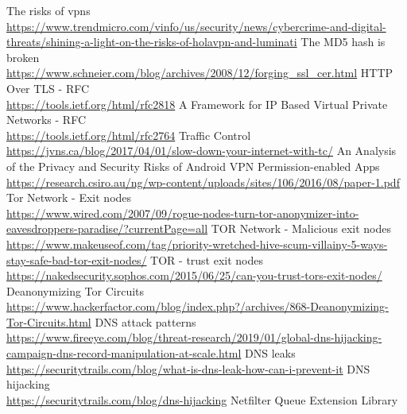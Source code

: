 \documentclass[12pt]{article}
\begin{document}
	
	\begin{thebibliography}{1}
			The risks of vpns\\
			\url{https://www.trendmicro.com/vinfo/us/security/news/cybercrime-and-digital-threats/shining-a-light-on-the-risks-of-holavpn-and-luminati}
			The MD5 hash is broken\\
			\url{https://www.schneier.com/blog/archives/2008/12/forging_ssl_cer.html}
			HTTP Over TLS - RFC\\
			\url{https://tools.ietf.org/html/rfc2818}
			A Framework for IP Based Virtual Private Networks - RFC\\
			\url{https://tools.ietf.org/html/rfc2764}
			Traffic Control\\
			\url{https://jvns.ca/blog/2017/04/01/slow-down-your-internet-with-tc/}
			An Analysis of the Privacy and Security Risks of
Android VPN Permission-enabled Apps\\
			\url{https://research.csiro.au/ng/wp-content/uploads/sites/106/2016/08/paper-1.pdf}
			Tor Network - Exit nodes\\
			\url{https://www.wired.com/2007/09/rogue-nodes-turn-tor-anonymizer-into-eavesdroppers-paradise/?currentPage=all}
			TOR Network - Malicious exit nodes\\
			\url{https://www.makeuseof.com/tag/priority-wretched-hive-scum-villainy-5-ways-stay-safe-bad-tor-exit-nodes/}
			TOR - trust exit nodes\\
			\url{https://nakedsecurity.sophos.com/2015/06/25/can-you-trust-tors-exit-nodes/}
			Deanonymizing Tor Circuits\\
			\url{https://www.hackerfactor.com/blog/index.php?/archives/868-Deanonymizing-Tor-Circuits.html}
			DNS attack patterns\\
			\url{https://www.fireeye.com/blog/threat-research/2019/01/global-dns-hijacking-campaign-dns-record-manipulation-at-scale.html}
			DNS leaks\\
			\url{https://securitytrails.com/blog/what-is-dns-leak-how-can-i-prevent-it}
			DNS hijacking\\
			\url{https://securitytrails.com/blog/dns-hijacking}
			Netfilter Queue Extension Library\\

\end{thebibliography}
\end{document}

